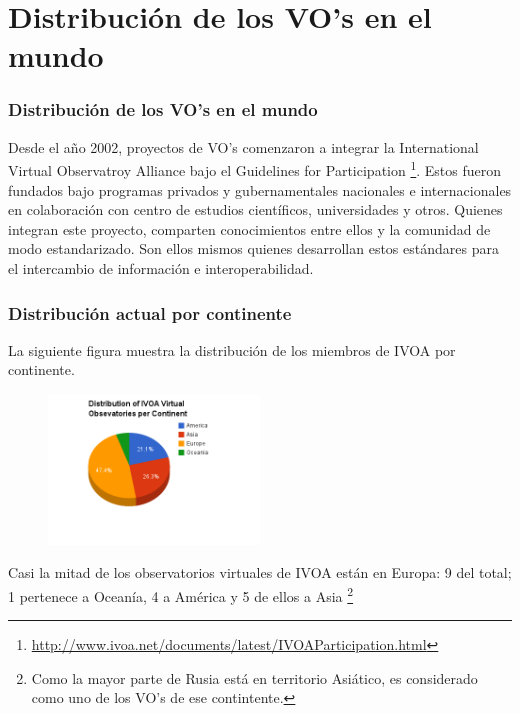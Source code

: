 \section{Distribución de los VO's en el mundo}


\begin{frame}
\frametitle{Distribución de los VO's en el mundo}

Desde el año 2002, proyectos de VO's comenzaron a integrar la International
Virtual Observatroy Alliance bajo el Guidelines for Participation
\footnote{\url{http://www.ivoa.net/documents/latest/IVOAParticipation.html}}.
\newline
\newline
Estos fueron fundados bajo programas privados y gubernamentales nacionales e
internacionales en colaboración con centro de estudios científicos,
universidades y otros. Quienes integran este proyecto, comparten conocimientos
entre ellos y la comunidad de modo estandarizado. Son ellos mismos quienes
desarrollan estos estándares para el intercambio de información e
interoperabilidad.

\end{frame}

\newpage

\begin{frame}
\frametitle{Distribución actual por continente}
La siguiente figura muestra la distribución de los miembros de IVOA por continente.
\begin{multicols}{2}
\begin{figure}[h!t]
    \begin{center}
        \includegraphics[width=0.5\textwidth]{img/ivoa_vos_distribution.png}
    \end{center}
\end{figure}

Casi la mitad de los observatorios virtuales de IVOA están en Europa: 9 del
total; 1 pertenece a Oceanía, 4 a América y 5 de ellos a Asia \footnote{Como la
mayor parte de Rusia está en territorio Asiático, es considerado como uno de
los VO's de ese contintente.} 
\end{multicols}
\end{frame}

